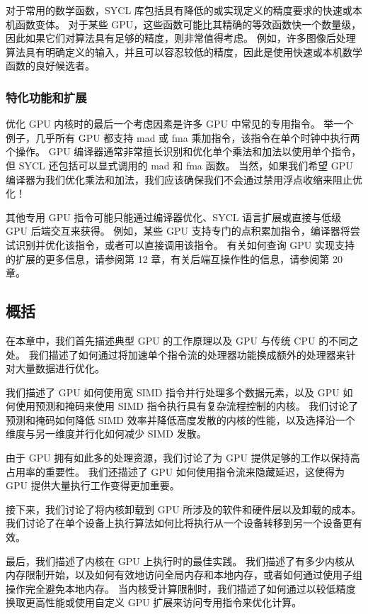对于常用的数学函数，SYCL 库包括具有降低的或实现定义的精度要求的快速或本机函数变体。 对于某些 GPU，这些函数可能比其精确的等效函数快一个数量级，因此如果它们对算法具有足够的精度，则非常值得考虑。 例如，许多图像后处理算法具有明确定义的输入，并且可以容忍较低的精度，因此是使用快速或本机数学函数的良好候选者。

\subsubsection{特化功能和扩展}
优化 GPU 内核时的最后一个考虑因素是许多 GPU 中常见的专用指令。 举一个例子，几乎所有 GPU 都支持 mad 或 fma 乘加指令，该指令在单个时钟中执行两个操作。 GPU 编译器通常非常擅长识别和优化单个乘法和加法以使用单个指令，但 SYCL 还包括可以显式调用的 mad 和 fma 函数。 当然，如果我们希望 GPU 编译器为我们优化乘法和加法，我们应该确保我们不会通过禁用浮点收缩来阻止优化！

其他专用 GPU 指令可能只能通过编译器优化、SYCL 语言扩展或直接与低级 GPU 后端交互来获得。 例如，某些 GPU 支持专门的点积累加指令，编译器将尝试识别并优化该指令，或者可以直接调用该指令。 有关如何查询 GPU 实现支持的扩展的更多信息，请参阅第 12 章，有关后端互操作性的信息，请参阅第 20 章。

\subsection{概括}
在本章中，我们首先描述典型 GPU 的工作原理以及 GPU 与传统 CPU 的不同之处。 我们描述了如何通过将加速单个指令流的处理器功能换成额外的处理器来针对大量数据进行优化。

我们描述了 GPU 如何使用宽 SIMD 指令并行处理多个数据元素，以及 GPU 如何使用预测和掩码来使用 SIMD 指令执行具有复杂流程控制的内核。 我们讨论了预测和掩码如何降低 SIMD 效率并降低高度发散的内核的性能，以及选择沿一个维度与另一维度并行化如何减少 SIMD 发散。

由于 GPU 拥有如此多的处理资源，我们讨论了为 GPU 提供足够的工作以保持高占用率的重要性。 我们还描述了 GPU 如何使用指令流来隐藏延迟，这使得为 GPU 提供大量执行工作变得更加重要。

接下来，我们讨论了将内核卸载到 GPU 所涉及的软件和硬件层以及卸载的成本。 我们讨论了在单个设备上执行算法如何比将执行从一个设备转移到另一个设备更有效。

最后，我们描述了内核在 GPU 上执行时的最佳实践。 我们描述了有多少内核从内存限制开始，以及如何有效地访问全局内存和本地内存，或者如何通过使用子组操作完全避免本地内存。 当内核受计算限制时，我们描述了如何通过以较低精度换取更高性能或使用自定义 GPU 扩展来访问专用指令来优化计算。

